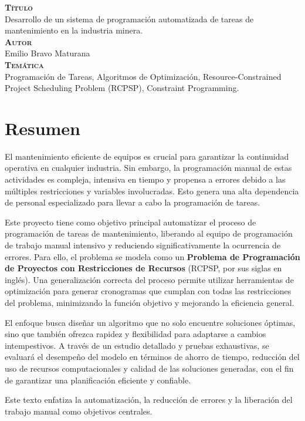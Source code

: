 \documentclass{article}
\begin{document}
{\bfseries\scshape Título}\\[.25cm]
Desarrollo de un sistema de programación automatizada de tareas de mantenimiento en la industria minera.\\


{\bfseries\scshape Autor}\\[.25cm]
Emilio Bravo Maturana\\

{\bfseries\scshape Temática}\\[.25cm]
Programación de Tareas, Algoritmos de Optimización, Resource-Constrained Project Scheduling Problem (RCPSP), Constraint Programming.

\newpage

\section*{Resumen}
El mantenimiento eficiente de equipos es crucial para garantizar la continuidad operativa en cualquier industria. Sin embargo, la programación manual de estas actividades es compleja, intensiva en tiempo y propensa a errores debido a las múltiples restricciones y variables involucradas. Esto genera una alta dependencia de personal especializado para llevar a cabo la programación de tareas.

Este proyecto tiene como objetivo principal automatizar el proceso de programación de tareas de mantenimiento, liberando al equipo de programación de trabajo manual intensivo y reduciendo significativamente la ocurrencia de errores. Para ello, el problema se modela como un \textbf{Problema de Programación de Proyectos con Restricciones de Recursos} (RCPSP, por sus siglas en inglés). Una generalización correcta del proceso permite utilizar herramientas de optimización para generar cronogramas que cumplan con todas las restricciones del problema, minimizando la función objetivo y mejorando la eficiencia general.

El enfoque busca diseñar un algoritmo que no solo encuentre soluciones óptimas, sino que también ofrezca rapidez y flexibilidad para adaptarse a cambios intempestivos. A través de un estudio detallado y pruebas exhaustivas, se evaluará el desempeño del modelo en términos de ahorro de tiempo, reducción del uso de recursos computacionales y calidad de las soluciones generadas, con el fin de garantizar una planificación eficiente y confiable.

Este texto enfatiza la automatización, la reducción de errores y la liberación del trabajo manual como objetivos centrales.
\end{document}
